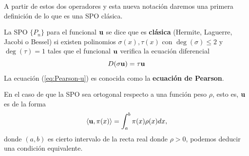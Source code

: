 A partir de estos dos operadores y esta nueva notación daremos una primera definición de lo que es una SPO clásica.

\begin{definicion}
    La SPO $\{P_n  \}$ para el funcional $\mathbf{u}$ se dice que es \textbf{clásica} (Hermite, Laguerre, Jacobi o Bessel) si existen polinomios $\sigma(x), \tau(x)$ con $\deg(\sigma)\leq 2$ y $\deg(\tau)= 1$ tales que el funcional $\mathbf{u}$ verifica la ecuación diferencial
    \begin{equation}
        \label{eq:Pearson-u}
        D(\sigma \mathbf{u}) = \tau \mathbf{u}
    \end{equation}   
    La ecuación (\ref{eq:Pearson-u}) es conocida como la \textbf{ecuación de Pearson}.
\end{definicion}

En el caso de que la SPO sea ortogonal respecto a una función peso $\rho$, esto es, $\mathbf{u}$ es de la forma
\begin{equation}
    \label{eq:funcional-peso}
    \left\langle \mathbf{u} , \pi(x) \right\rangle = \int_a^b \pi(x)\rho(x)dx,
\end{equation}
donde $(a,b)$ es cierto intervalo de la recta real donde $\rho > 0$, podemos deducir una condición equivalente.

